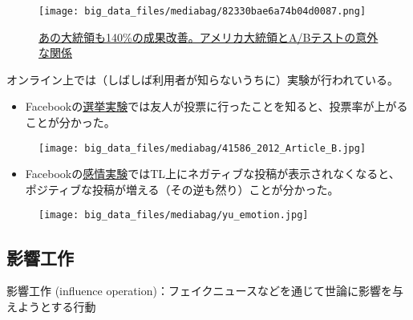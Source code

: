 \documentclass[
  xelatex,
  ja=standard]{bxjsarticle}
\providecommand{\tightlist}{%
  \setlength{\itemsep}{0pt}\setlength{\parskip}{0pt}}\usepackage{longtable,booktabs,array}
\begin{document}
\begin{figure}[htpb]

{\centering \texttt{[image: big\_data\_files/mediabag/82330bae6a74b04d0087.png]}

}

\caption{\href{https://juicer.cc/articles/archives/1273/}{あの大統領も140\%の成果改善。アメリカ大統領とA/Bテストの意外な関係}}

\end{figure}

オンライン上では（しばしば利用者が知らないうちに）実験が行われている。

\begin{itemize}
\tightlist
\item
  Facebookの\href{https://www.afpbb.com/articles/-/2900894}{選挙実験}では友人が投票に行ったことを知ると、投票率が上がることが分かった。
\end{itemize}

\begin{figure}[htpb]

{\centering \texttt{[image: big\_data\_files/mediabag/41586\_2012\_Article\_B.jpg]}

}

\caption{\citet{bond2012}}

\end{figure}

\begin{itemize}
\tightlist
\item
  Facebookの\href{https://www.itmedia.co.jp/news/articles/1406/29/news007.html}{感情実験}ではTL上にネガティブな投稿が表示されなくなると、ポジティブな投稿が増える（その逆も然り）ことが分かった。
\end{itemize}

\begin{figure}[htpb]

{\centering \texttt{[image: big\_data\_files/mediabag/yu\_emotion.jpg]}

}

\caption{\citet{kramer2014}}

\end{figure}

\hypertarget{ux5f71ux97ffux5de5ux4f5c}{%
\subsection{影響工作}\label{ux5f71ux97ffux5de5ux4f5c}}

影響工作 (influence
operation)：フェイクニュースなどを通じて世論に影響を与えようとする行動
\end{document}
